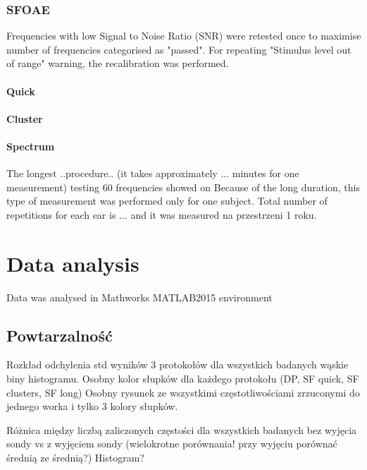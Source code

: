 \documentclass{pracalicmgr}
\begin{document}
	\subsection{SFOAE}
	Frequencies with low Signal to Noise Ratio (SNR) were retested once to maximise number of frequencies categorised as "passed". For repeating "Stimulus level out of range" warning, the recalibration was performed.
	\subsubsection{Quick}
	\subsubsection{Cluster}
	\subsubsection{Spectrum}
	The longest ..procedure.. (it takes approximately ... minutes for one measurement) testing 60 frequencies showed on %
Because of the long duration, this type of measurement was performed only for one subject. Total number of repetitions for each ear is ... and it was measured na przestrzeni 1 roku.
\chapter{Data analysis}
Data was analysed in Mathworks MATLAB2015 environment
    \section{Powtarzalność}
    	Rozkład odchylenia std wyników 3 protokołów dla wszystkich badanych
    wąskie biny histogramu. Osobny kolor słupków dla każdego protokołu (DP, SF quick, SF clusters, SF long)
    Osobny rysunek ze wszystkimi częstotliwościami zrzuconymi do jednego worka i tylko 3 kolory słupków.
    
    Różnica między liczbą zaliczonych częstości dla wszystkich badanych bez wyjęcia sondy vs z wyjęciem sondy (wielokrotne porównania! przy wyjęciu porównać średnią ze średnią?) Histogram?
\end{document}

